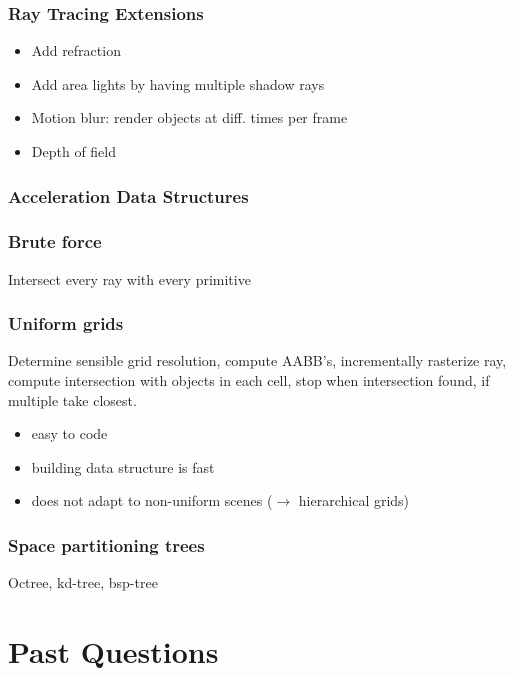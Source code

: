 \documentclass[a4paper,10pt]{article}
\newcommand*\good{\item[\textcolor{goodgreen}{\(\bm{+}\)}]}
\newcommand*\bad{\item[\textcolor{badred}{\(\bm{-}\)}]}
\begin{document}
\subsubsection{Ray Tracing Extensions}
\begin{itemize}
    \item Add refraction
    \item Add area lights by having multiple shadow rays
    \item Motion blur: render objects at diff. times per frame
    \item Depth of field
\end{itemize}

\subsubsection{Acceleration Data Structures}
\smallskip
\subsubsection{Brute force} Intersect every ray with every primitive
\subsubsection{Uniform grids} Determine sensible grid resolution, compute AABB's, incrementally rasterize ray, compute intersection with objects in each cell, stop when intersection found, if multiple take closest.
\begin{itemize}
    \good easy to code
    \good building data structure is fast
    \bad does not adapt to non-uniform scenes (\( \to  \) hierarchical grids)
\end{itemize}
\subsubsection{Space partitioning trees} Octree, kd-tree, bsp-tree

\section{Past Questions}
\end{document}

